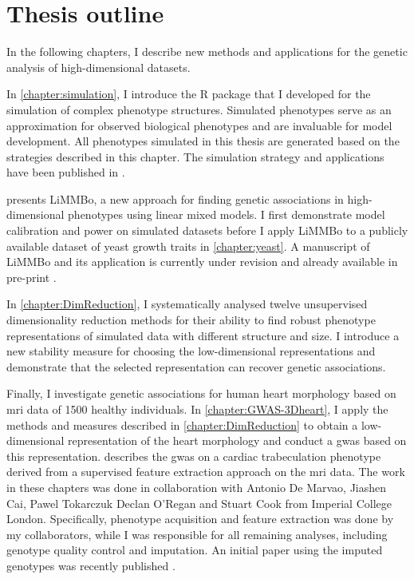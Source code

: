 \section{Thesis outline}
In the following chapters, I describe new methods and applications for the genetic analysis of high-dimensional datasets. 

In \cref{chapter:simulation}, I introduce the R package that I developed for the simulation of complex phenotype structures. Simulated phenotypes serve as an approximation for observed biological phenotypes and are invaluable for model development. All phenotypes simulated in this thesis are generated based on the strategies described in this chapter. The simulation strategy and applications have been published in \citep{Meyer2018b}.

 presents LiMMBo, a new approach for finding genetic associations in high-dimensional phenotypes using linear mixed models. I first demonstrate model calibration and power on simulated datasets before I apply LiMMBo to a publicly available dataset of yeast growth traits in \cref{chapter:yeast}. A manuscript of LiMMBo and its application is currently under revision and already available in pre-print \citep{Meyer2018a}.

In \cref{chapter:DimReduction}, I systematically analysed twelve unsupervised dimensionality reduction methods for their ability to find robust phenotype representations of simulated data with different structure and size. I introduce a new stability measure for choosing the low-dimensional representations and demonstrate that the selected representation can recover genetic associations.

Finally, I investigate genetic associations for human heart morphology based on \gls{mri} data of \num{1500} healthy individuals. In \cref{chapter:GWAS-3Dheart}, I apply the methods and measures described in \cref{chapter:DimReduction} to obtain a low-dimensional representation of the heart morphology and conduct a \gls{gwas} based on this representation.  describes the \gls{gwas} on a cardiac trabeculation phenotype derived from a supervised feature extraction approach on the \gls{mri} data.  The work in these chapters was done in collaboration with Antonio De Marvao, Jiashen Cai, Pawel Tokarczuk Declan O'Regan and Stuart Cook from Imperial College London. Specifically, phenotype acquisition and feature extraction was done by my collaborators, while I was responsible for all remaining analyses, including genotype quality control and imputation. An initial paper using the imputed genotypes was recently published \citep{Biffi2017}.





